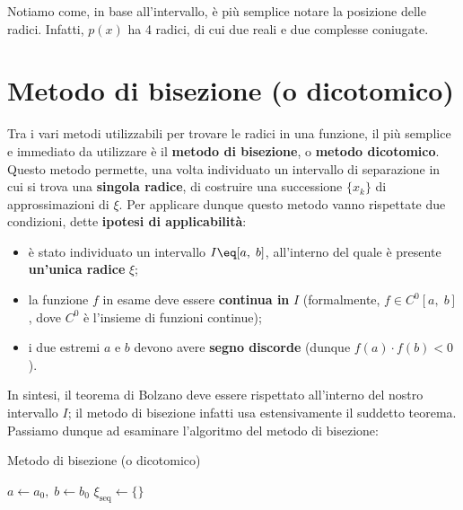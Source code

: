 Notiamo come, in base all'intervallo, è più semplice notare la posizione delle radici. Infatti, $p(x)$ ha 4 radici, di cui due reali e due complesse coniugate.

\section{Metodo di bisezione (o dicotomico)}

Tra i vari metodi utilizzabili per trovare le radici in una funzione, il più semplice e immediato da utilizzare è il \textbf{metodo di bisezione}, o \textbf{metodo dicotomico}. Questo metodo permette, una volta individuato un intervallo di separazione in cui si trova una \textbf{singola radice}, di costruire una successione $\{ x_k \}$ di approssimazioni di $\xi$. Per applicare dunque questo metodo vanno rispettate due condizioni, dette \textbf{ipotesi di applicabilità}:
\begin{itemize}
    \item è stato individuato un intervallo $I \eq [a, \; b]$, all'interno del quale è presente \textbf{un'unica radice} $\xi$;
    \item la funzione $f$ in esame deve essere \textbf{continua in} $I$ (formalmente, $f \in C^0 [a, \; b]$, dove $C^0$ è l'insieme di funzioni continue);
    \item i due estremi $a$ e $b$ devono avere \textbf{segno discorde} (dunque $f(a) \cdot f(b) < 0$).
\end{itemize}

In sintesi, il teorema di Bolzano deve essere rispettato all'interno del nostro intervallo $I$; il metodo di bisezione infatti usa estensivamente il suddetto teorema. Passiamo dunque ad esaminare l'algoritmo del metodo di bisezione:

\begin{algorithm}[H]
    \caption{Metodo di bisezione (o dicotomico)}
    $a \gets a_0, \; b \gets b_0$\;
    $\xi_{\text{seq}} \gets \{\}$ 
\end{algorithm}